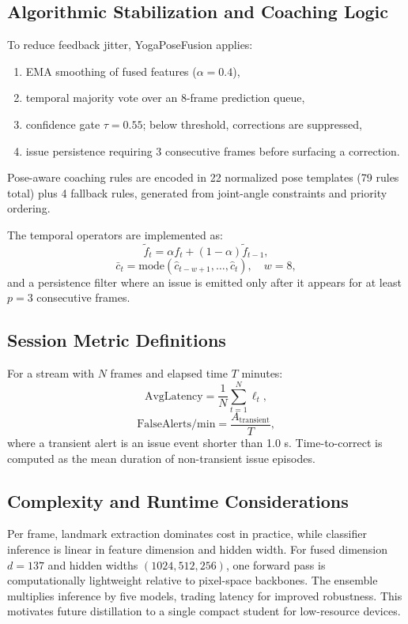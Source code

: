 \documentclass[conference]{IEEEtran}
\begin{document}
\subsection{Algorithmic Stabilization and Coaching Logic}
To reduce feedback jitter, YogaPoseFusion applies:
\begin{enumerate}
\item EMA smoothing of fused features ($\alpha = 0.4$),
\item temporal majority vote over an 8-frame prediction queue,
\item confidence gate $\tau = 0.55$; below threshold, corrections are suppressed,
\item issue persistence requiring 3 consecutive frames before surfacing a correction.
\end{enumerate}

Pose-aware coaching rules are encoded in 22 normalized pose templates (79 rules total) plus 4 fallback rules, generated from joint-angle constraints and priority ordering.

The temporal operators are implemented as:
\begin{equation}
\tilde{f}_t = \alpha f_t + (1-\alpha)\tilde{f}_{t-1},
\end{equation}
\begin{equation}
\bar{c}_t = \mathrm{mode}\left(\hat{c}_{t-w+1}, \ldots, \hat{c}_t\right), \quad w=8,
\end{equation}
and a persistence filter where an issue is emitted only after it appears for at least $p=3$ consecutive frames.

\subsection{Session Metric Definitions}
For a stream with $N$ frames and elapsed time $T$ minutes:
\begin{equation}
\mathrm{AvgLatency} = \frac{1}{N}\sum_{t=1}^{N} \ell_t,
\end{equation}
\begin{equation}
\mathrm{FalseAlerts/min} = \frac{A_{\mathrm{transient}}}{T},
\end{equation}
where a transient alert is an issue event shorter than 1.0 s. Time-to-correct is computed as the mean duration of non-transient issue episodes.

\subsection{Complexity and Runtime Considerations}
Per frame, landmark extraction dominates cost in practice, while classifier inference is linear in feature dimension and hidden width. For fused dimension $d=137$ and hidden widths $(1024,512,256)$, one forward pass is computationally lightweight relative to pixel-space backbones. The ensemble multiplies inference by five models, trading latency for improved robustness. This motivates future distillation to a single compact student for low-resource devices.
\end{document}
